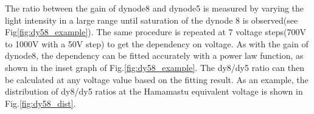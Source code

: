 \documentclass[5p, times]{elsarticle}
\begin{document}

The ratio between the gain of dynode8 and dynode5 is measured by varying the light intensity in a large range until saturation of the dynode 8 is observed(see Fig\ref{fig:dy58_example}).
The same procedure is repeated at 7 voltage steps(700V to 1000V with a 50V step) to get the dependency on voltage.
As with the gain of dynode8, the dependency can be fitted accurately with a power law function, as shown in the inset graph of Fig.\ref{fig:dy58_example}.
The dy8/dy5 ratio can then be calculated at any voltage value based on the fitting result.
As an example, the distribution of dy8/dy5 ratios at the Hamamastu equivalent voltage is shown in Fig.\ref{fig:dy58_dist}.
\end{document}
